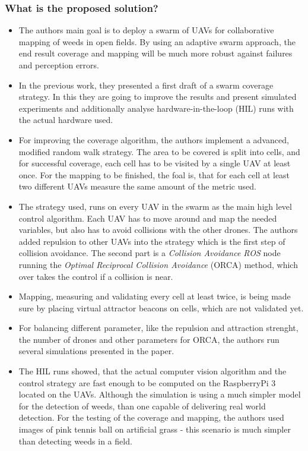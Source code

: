     \subsubsection*{What is the proposed solution?}
    \begin{itemize}
        \item The authors main goal is to deploy a swarm of UAVs for collaborative mapping of weeds in open fields. By using an adaptive swarm approach, the end result coverage and mapping will be much more robust against failures and perception errors.
        \item In the previous work, they presented a first draft of a swarm coverage strategy. In this they are going to improve the results and present simulated experiments and additionally analyse hardware-in-the-loop (HIL) runs with the actual hardware used.
        \item For improving the coverage algorithm, the authors implement a advanced, modified random walk strategy. The area to be covered is split into cells, and for successful coverage, each cell has to be visited by a single UAV at least once. For the mapping to be finished, the foal is, that for each cell at least two different UAVs measure the same amount of the metric used.
        \item The strategy used, runs on every UAV in the swarm as the main high level control algorithm. Each UAV has to move around and map the needed variables, but also has to avoid collisions with the other drones. The authors added repulsion to other UAVs into the strategy which is the first step of collision avoidance. The second part is a \emph{Collision Avoidance ROS} node running the \emph{Optimal Reciprocal Collision Avoidance} (ORCA) method, which over takes the control if a collision is near. 
        \item Mapping, measuring and validating every cell at least twice, is being made sure by placing virtual attractor beacons on cells, which are not validated yet.
        \item For balancing different  parameter, like the repulsion and attraction strenght, the number of drones and other parameters for ORCA, the authors run several simulations presented in the paper.
        \item The HIL runs showed, that the actual computer vision algorithm and the control strategy are fast enough to be computed on the RaspberryPi 3 located on the UAVs. Although the simulation is using a much simpler model for the detection of weeds, than one capable of delivering real world detection. For the testing of the coverage and mapping, the authors used images of pink tennis ball on artificial grass - this scenario is much simpler than detecting weeds in a field.
    \end{itemize}
